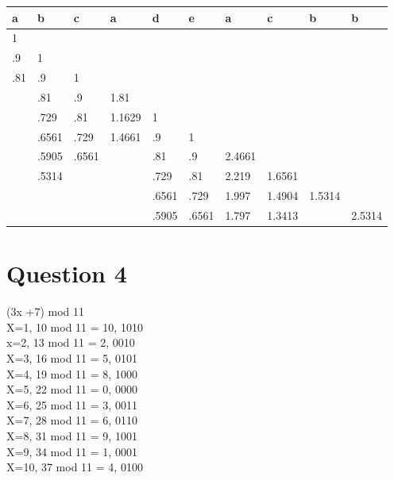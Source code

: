\documentclass{article}
\begin{document}
\begin{center}
\begin{table}[h]
\begin{tabular}{|l|l|l|l|l|l|l|l|l|l|}
\hline
\textbf{a} & \textbf{b} & \textbf{c} & \textbf{a} & \textbf{d} & \textbf{e} & \textbf{a} & \textbf{c} & \textbf{b} & \textbf{b} \\ \hline
1          &            &            &            &            &            &            &            &            &            \\ \hline
.9         & 1          &            &            &            &            &            &            &            &            \\ \hline
.81        & .9         & 1          &            &            &            &            &            &            &            \\ \hline
           & .81        & .9         & 1.81       &            &            &            &            &            &            \\ \hline
           & .729       & .81        & 1.1629     & 1          &            &            &            &            &            \\ \hline
           & .6561      & .729       & 1.4661     & .9         & 1          &            &            &            &            \\ \hline
           & .5905      & .6561      &            & .81        & .9         & 2.4661     &            &            &            \\ \hline
           & .5314      &            &            & .729       & .81        & 2.219      & 1.6561     &            &            \\ \hline
           &            &            &            & .6561      & .729       & 1.997      & 1.4904     & 1.5314     &            \\ \hline
           &            &            &            & .5905      & .6561      & 1.797      & 1.3413     &            & 2.5314     \\ \hline
\end{tabular}
\end{table}
\end{center}

\section{Question 4}

(3x +7) mod 11\\
X=1, 10 mod 11 = 10, 1010\\
x=2, 13 mod 11 = 2, 0010\\
X=3, 16 mod 11 = 5, 0101\\
X=4, 19 mod 11 = 8, 1000\\
X=5, 22 mod 11 = 0, 0000\\
X=6, 25 mod 11 = 3, 0011\\
X=7, 28 mod 11 = 6, 0110\\
X=8, 31 mod 11 = 9, 1001\\
X=9, 34 mod 11 = 1, 0001\\
X=10, 37 mod 11 = 4, 0100\\
\end{document}
